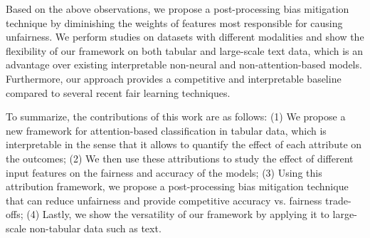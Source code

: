 Based on the above observations, we propose a post-processing bias mitigation technique by diminishing the weights of features most responsible for causing unfairness. We perform studies on datasets with different modalities and show the flexibility of our framework on both tabular and large-scale text data, which is an advantage over existing interpretable non-neural and non-attention-based models. Furthermore, our approach provides a competitive and interpretable baseline compared to several recent fair learning techniques.

To summarize, the contributions of this work are as follows: (1) We propose a new framework for attention-based classification in tabular data, which is interpretable in the sense that it allows to quantify the effect of each attribute on the outcomes; (2) We then use these attributions to study the effect of different input features on the fairness and accuracy of the models; (3) Using this attribution framework, we propose a post-processing bias mitigation technique that can reduce unfairness and provide competitive accuracy vs. fairness trade-offs; (4) Lastly, we show the versatility of our framework by applying it to large-scale non-tabular data such as text.






